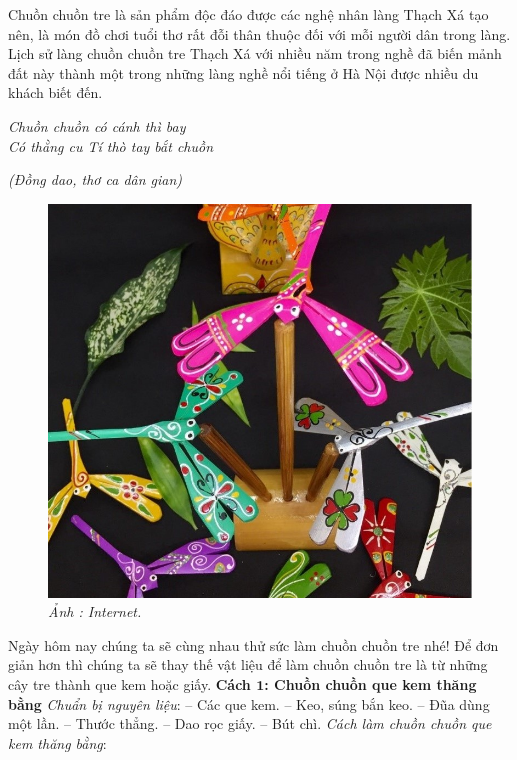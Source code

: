 \begin{multicols}{2}
	Chuồn chuồn tre là sản phẩm độc đáo được các nghệ nhân làng Thạch Xá tạo nên, là món đồ chơi tuổi thơ rất đỗi thân thuộc đối với mỗi người dân trong làng. Lịch sử làng chuồn chuồn tre Thạch Xá với nhiều năm trong nghề đã biến mảnh đất này thành một trong những làng nghề nổi tiếng ở Hà Nội được nhiều du khách biết đến.
	\begin{center}
		\textit{Chuồn chuồn có cánh thì bay\\
			Có thằng cu Tí thò tay bắt chuồn}
	\end{center}
	\hfill \textit{(Đồng dao, thơ ca dân gian)}
	\begin{figure}[H]
		\vspace*{-5pt}
		\centering
		\captionsetup{labelformat= empty, justification=centering}
		\includegraphics[width= 0.85\linewidth]{10}
		\caption{\small\textit{\color{toancuabi}Ảnh : Internet.}}
		\vspace*{-10pt}
	\end{figure}
	Ngày hôm nay chúng ta sẽ cùng nhau thử sức làm chuồn chuồn tre nhé! Để đơn giản hơn thì chúng ta sẽ thay thế vật liệu để làm chuồn chuồn tre là từ những cây tre thành que kem hoặc giấy.
	\vskip 0.1cm
	\textbf{\color{toancuabi}Cách $\pmb{1}$: Chuồn chuồn que kem thăng bằng}
	\vskip 0.1cm
	\textit{Chuẩn bị nguyên liệu}: 
	\vskip 0.05cm
	-- Các que kem.
	\vskip 0.05cm
	-- Keo, súng bắn keo.
	\vskip 0.05cm
	-- Đũa dùng một lần.
	\vskip 0.05cm
	-- Thước thẳng.
	\vskip 0.05cm
	-- Dao rọc giấy.
	\vskip 0.05cm
	-- Bút chì.
	\vskip 0.05cm
	\textit{Cách làm chuồn chuồn que kem thăng bằng}:

\end{multicols}
